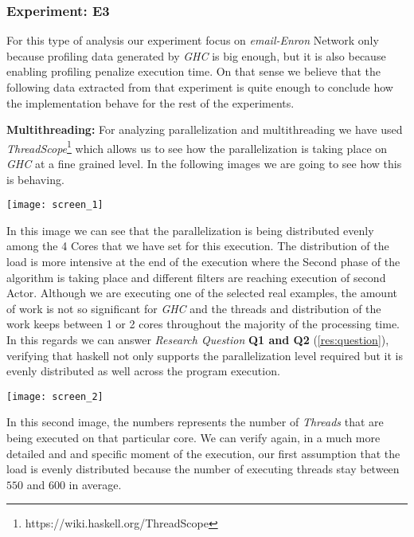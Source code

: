 \documentclass[preprint]{elsarticle}
\begin{document}
\subsubsection{\textbf{Experiment: E3}}

For this type of analysis our experiment focus on \textit{email-Enron} Network only because profiling data generated by \textit{GHC} is big enough, but it is also because enabling profiling penalize execution time. 
On that sense we believe that the following data extracted from that experiment is quite enough to conclude how the implementation behave for the rest of the experiments.

\textbf{Multithreading:} For analyzing parallelization and multithreading we have used \textit{ThreadScope}\footnote{https://wiki.haskell.org/ThreadScope} which allows us to see how the parallelization is taking place
on \textit{GHC} at a fine grained level. In the following images we are going to see how this is behaving.

\begin{minipage}[t]{\linewidth}
  \texttt{[image: screen\_1]}
  \captionsetup{type=figure}
  \label{fig:3}
\end{minipage}

In this image we can see that the parallelization is being distributed evenly among the 4 Cores that we have set for this execution.
The distribution of the load is more intensive at the end of the execution where the Second phase of the algorithm is taking place and different filters are reaching execution of second Actor.
Although we are executing one of the selected real examples, the amount of work is not so significant for \textit{GHC} and the threads and distribution of the work keeps between 1 or 2 cores throughout 
the majority of the processing time. In this regards we can answer \emph{Research Question} \textbf{Q1 and Q2} (\autoref{res:question}), verifying that \acrshort{haskell} not only supports the parallelization level required but it is evenly distributed as well across the program execution.


\begin{minipage}[t]{\linewidth}
  \texttt{[image: screen\_2]}
  \captionsetup{type=figure}
  \label{fig:4}
\end{minipage}

In this second image, the numbers represents the number of \textit{Threads} that are being executed on that particular core.
We can verify again, in a much more detailed and and specific moment of the execution, our first assumption that the load is evenly distributed because the number of executing threads stay between $550$ and $600$
in average.
\end{document}
